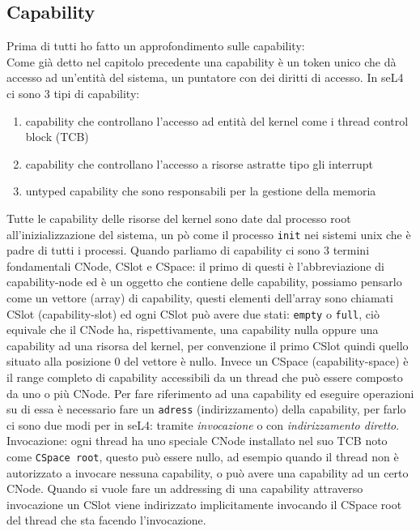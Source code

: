 \subsection{Capability}
Prima di tutti ho fatto un approfondimento sulle capability:\\
Come già detto nel capitolo precedente una capability è un token unico che dà accesso ad un'entità del sistema, un puntatore con dei diritti di accesso. In seL4 ci sono 3 tipi di capability:
\begin{enumerate}
	\item capability che controllano l'accesso ad entità del kernel come i thread control block (TCB)
	\item capability che controllano l'accesso a risorse astratte tipo gli interrupt 
	\item untyped capability che sono responsabili per la gestione della memoria
\end{enumerate}
Tutte le capability delle risorse del kernel sono date dal processo root all'inizializzazione del sistema, un pò come il processo \texttt{init} nei sistemi unix che è padre di tutti i processi. Quando parliamo di capability ci sono 3 termini fondamentali CNode, CSlot e CSpace:
il primo di questi è l'abbreviazione di capability-node ed è un oggetto che contiene delle capability, possiamo pensarlo come un vettore (array) di capability, questi elementi dell'array sono chiamati CSlot (capability-slot) ed ogni CSlot può avere due stati: \texttt{empty} o \texttt{full}, ciò equivale che il CNode ha, rispettivamente, una capability nulla oppure una capability ad una risorsa del kernel, per convenzione il primo CSlot quindi quello situato alla posizione 0 del vettore è nullo. Invece un CSpace (capability-space) è il range completo di capability accessibili da un thread che può essere composto da uno o più CNode.
Per fare riferimento ad una capability ed eseguire operazioni su di essa è necessario fare un \texttt{adress} (indirizzamento) della capability, per farlo ci sono due modi per in seL4: tramite \textit{invocazione} o con \textit{indirizzamento diretto}.\\
Invocazione: ogni thread ha uno speciale CNode installato nel suo TCB noto come \texttt{CSpace root}, questo può essere nullo, ad esempio quando il thread non è autorizzato a invocare nessuna capability, o può avere una capability ad un certo CNode. Quando si vuole fare un addressing di una capability attraverso invocazione un CSlot viene indirizzato implicitamente invocando il CSpace root del thread che sta facendo l'invocazione.\\
